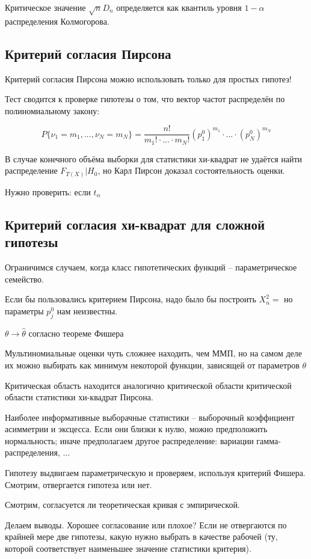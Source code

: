 \documentclass[main.tex]{subfiles}
\begin{document}
Критическое значение $ \sqrt n D_n $ определяется как квантиль уровня $ 1 - \alpha $ распределения Колмогорова.

\subsection{Критерий согласия Пирсона}

Критерий согласия Пирсона можно использовать только для простых гипотез!

Тест сводится к проверке гипотезы о том, что вектор частот распределён по полиномиальному закону:

$$ P\{\nu_1 = m_1, ..., \nu_N = m_N\} = \frac{n!}{m_1! \cdot ... \cdot m_N!} (p_1^0)^{m_1} \cdot ... \cdot (p_N^0)^{m_N} $$

В случае конечного объёма выборки для статистики хи-квадрат не удаётся найти распределение $ F_{T(X)} | H_0 $, но Карл Пирсон доказал состоятельность оценки.


Нужно проверить: если $ t_\alpha $

\subsection{Критерий согласия хи-квадрат для сложной гипотезы}

Ограничимся случаем, когда класс гипотетических функций -- параметрическое семейство.

Если бы пользовались критерием Пирсона, надо было бы построить $ X_n^2 = $ %
но параметры $p_j^0$ нам неизвестны.

$ \theta \to \hat \theta $  согласно теореме Фишера


Мультиномиальные оценки чуть сложнее находить, чем ММП, но на самом деле их можно выбирать как минимум некоторой функции, зависящей от параметров $ \theta $

Критическая область находится аналогично критической области критической области статистики хи-квадрат Пирсона.


Наиболее информативные выборачные статистики -- выборочный коэффициент асимметрии и эксцесса.
Если они близки к нулю, можно предположить нормальность; иначе предполагаем другое распределение: вариации гамма-распределения, ...

Гипотезу выдвигаем параметрическую и проверяем, используя критерий Фишера.
Смотрим, отвергается гипотеза или нет.

Смотрим, согласуется ли теоретическая кривая с эмпирической.

Делаем выводы.
Хорошее согласование или плохое?
Если не отвергаются по крайней мере две гипотезы, какую нужно выбрать в качестве рабочей (ту, которой соответствует наименьшее значение статистики критерия).
\end{document}
